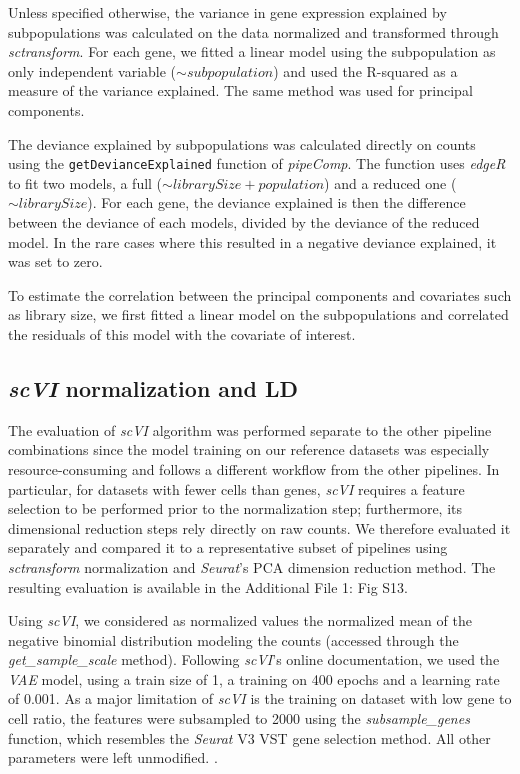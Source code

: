 \documentclass{bmcart}
\begin{document}
Unless specified otherwise, the variance in gene expression explained by subpopulations was calculated on the data normalized and transformed through \textit{sctransform}. For each gene, we fitted a linear model using the subpopulation as only independent variable ($\sim subpopulation$) and used the R-squared as a measure of the variance explained. The same method was used for principal components.

The deviance explained by subpopulations was calculated directly on counts using the \linebreak \texttt{getDevianceExplained} function of \textit{pipeComp}. The function uses \textit{edgeR} to fit two models, a full ($\sim librarySize + population$) and a reduced one ($\sim librarySize$). For each gene, the deviance explained is then the difference between the deviance of each models, divided by the deviance of the reduced model. In the rare cases where this resulted in a negative deviance explained, it was set to zero.

To estimate the correlation between the principal components and covariates such as library size, we first fitted a linear model on the subpopulations and correlated the residuals of this model with the covariate of interest.

\subsection*{\textit{scVI} normalization and LD}

The evaluation of \textit{scVI} algorithm was performed separate to the other pipeline combinations since the model training on our reference datasets was especially resource-consuming  and follows a different workflow from the other pipelines. In particular, for datasets with fewer cells than genes, \textit{scVI} requires a feature selection to be performed prior to the normalization step; furthermore, its dimensional reduction steps rely directly on raw counts. We therefore evaluated it separately and compared it to a representative subset of pipelines using \textit{sctransform} normalization and \textit{Seurat}'s PCA dimension reduction method. The resulting evaluation is available in the Additional File 1: Fig S13.

Using \textit{scVI}, we considered as normalized values the normalized mean of the negative binomial distribution modeling the counts (accessed through the \textit{get\_sample\_scale} method). Following \textit{scVI}'s online documentation, we used the \textit{VAE} model, using a train size of 1, a training on 400 epochs and a learning rate of 0.001. As a major limitation of \textit{scVI} is the training on dataset with low gene to cell ratio, the features were subsampled to 2000 using the \textit{subsample\_genes} function, which resembles the \textit{Seurat} V3 VST gene selection method. All other parameters were left unmodified.  . 
\end{document}
